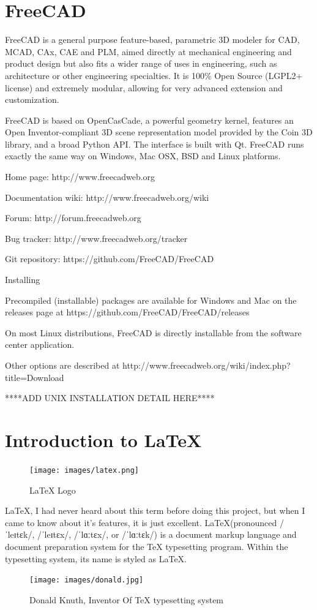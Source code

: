 \section{FreeCAD}
FreeCAD is a general purpose feature-based, parametric 3D modeler for CAD, MCAD, CAx, CAE and PLM, aimed directly at mechanical engineering and product design but also fits a wider range of uses in engineering, such as architecture or other engineering specialties. It is 100\% Open Source (LGPL2+ license) and extremely modular, allowing for very advanced extension and customization.

FreeCAD is based on OpenCasCade, a powerful geometry kernel, features an Open Inventor-compliant 3D scene representation model provided by the Coin 3D library, and a broad Python API. The interface is built with Qt. FreeCAD runs exactly the same way on Windows, Mac OSX, BSD and Linux platforms.

Home page: http://www.freecadweb.org

Documentation wiki: http://www.freecadweb.org/wiki

Forum: http://forum.freecadweb.org

Bug tracker: http://www.freecadweb.org/tracker

Git repository: https://github.com/FreeCAD/FreeCAD

Installing

Precompiled (installable) packages are available for Windows and Mac on the releases page at https://github.com/FreeCAD/FreeCAD/releases

On most Linux distributions, FreeCAD is directly installable from the software center application.

Other options are described at http://www.freecadweb.org/wiki/index.php?title=Download

****ADD UNIX INSTALLATION DETAIL HERE****


\section{Introduction to \LaTeX}
\begin{figure}[ht]
\centering
\texttt{[image: images/latex.png]}
\caption{\LaTeX{} Logo}
\end{figure}
\hspace{-1.8em} \LaTeX{}, I had never heard about this term before doing this project,
but when I came to know about it's features, it is just excellent. 
\LaTeX (pronounced /ˈleɪtɛk/, /ˈleɪtɛx/, /ˈlɑːtɛx/, or /ˈlɑːtɛk/) is a 
document markup language and document preparation system for the \TeX{} 
typesetting  program. Within the typesetting system, its name is styled 
as \LaTeX.
\begin{figure}[ht]
\centering
\texttt{[image: images/donald.jpg]}
\caption{Donald Knuth, Inventor Of \TeX{} typesetting system}
\end{figure}

